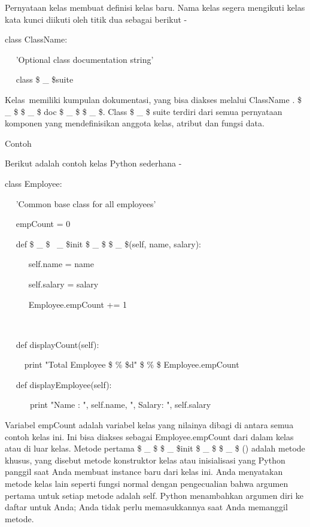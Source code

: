 Pernyataan kelas membuat definisi kelas baru. Nama kelas segera mengikuti kelas kata kunci diikuti oleh titik dua sebagai berikut - \par
\vspace{12pt}
\vspace{12pt}
\noindent 
class ClassName: \par
\noindent 
~~ 'Optional class documentation string' \par
\noindent 
~~ class \$  \_  \$suite \par
\vspace{12pt}
\vspace{12pt}
Kelas~memiliki kumpulan dokumentasi, yang bisa diakses melalui ClassName . \$  \_  \$ \$  \_  \$ doc \$  \_  \$ \$  \_  \$.  Class \$  \_  \$ suite terdiri dari semua pernyataan komponen yang mendefinisikan anggota kelas, atribut dan fungsi data. \par
\vspace{12pt}
\vspace{12pt}
\noindent 
Contoh \par
\vspace{12pt}
\noindent 
Berikut adalah contoh kelas Python sederhana - \par
\vspace{12pt}
\noindent 
class Employee: \par
\noindent 
~~ 'Common base class for all employees' \par
\noindent 
~~ empCount = 0 \par
\vspace{12pt}
\noindent 
~~ def  \$  \_  \$ \  \_  \$init \$  \_  \$ \$  \_  \$(self, name, salary): \par
\noindent 
~~~~~ self.name = name \par
\noindent 
~~~~~ self.salary = salary \par
\noindent 
~~~~~ Employee.empCount += 1 \par
\noindent 
~~  \par
\noindent 
~~ def displayCount(self): \par
\noindent 
~~~~ print "Total Employee  \$  \%  \$d"  \$  \%  \$ Employee.empCount \par
\vspace{12pt}
\noindent 
~~ def displayEmployee(self): \par
\noindent 
~~~~~~print "Name : ", self.name,  ", Salary: ", self.salary \par
\vspace{12pt}
Variabel empCount adalah variabel kelas yang nilainya dibagi di antara semua contoh kelas ini. Ini bisa diakses sebagai Employee.empCount dari dalam kelas atau di luar kelas. Metode pertama  \$  \_  \$ \$  \_  \$init  \$  \_  \$ \$  \_  \$ () adalah metode khusus, yang disebut metode konstruktor kelas atau inisialisasi yang Python panggil saat Anda membuat instance baru dari kelas ini. Anda menyatakan metode kelas lain seperti fungsi normal dengan pengecualian bahwa argumen pertama untuk setiap metode adalah self. Python menambahkan argumen diri ke daftar untuk Anda; Anda tidak perlu memasukkannya saat Anda memanggil metode. \par
